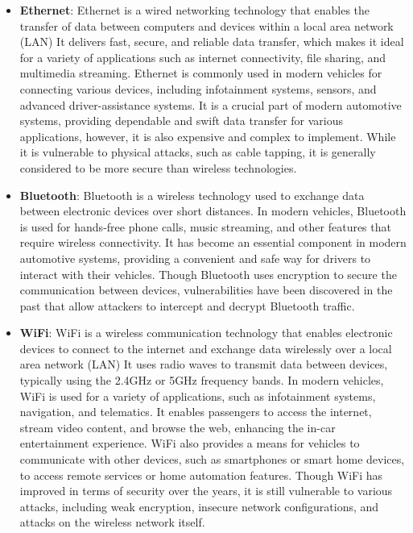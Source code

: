 \begin{itemize}
    \item \textbf{Ethernet}: Ethernet is a wired networking technology that enables the transfer of data between computers and devices within a local area network (LAN)
    It delivers fast, secure, and reliable data transfer, which makes it ideal for a variety of applications such as internet connectivity, file sharing, and multimedia streaming.
    Ethernet is commonly used in modern vehicles for connecting various devices, including infotainment systems, sensors, and advanced driver-assistance systems. 
    It is a crucial part of modern automotive systems, providing dependable and swift data transfer for various applications, however, it is also expensive and complex to implement.
    While it is vulnerable to physical attacks, such as cable tapping, it is generally considered to be more secure than wireless technologies.

    \item \textbf{Bluetooth}: Bluetooth is a wireless technology used to exchange data between electronic devices over short distances.
    In modern vehicles, Bluetooth is used for hands-free phone calls, music streaming, and other features that require wireless connectivity. 
    It has become an essential component in modern automotive systems, providing a convenient and safe way for drivers to interact with their vehicles.
    Though Bluetooth uses encryption to secure the communication between devices, vulnerabilities have been discovered in the past that allow attackers to intercept and decrypt Bluetooth traffic.

    \item \textbf{WiFi}: WiFi is a wireless communication technology that enables electronic devices to connect to the internet and exchange data wirelessly over a local area network (LAN)
    It uses radio waves to transmit data between devices, typically using the 2.4GHz or 5GHz frequency bands.
    In modern vehicles, WiFi is used for a variety of applications, such as infotainment systems, navigation, and telematics. 
    It enables passengers to access the internet, stream video content, and browse the web, enhancing the in-car entertainment experience. 
    WiFi also provides a means for vehicles to communicate with other devices, such as smartphones or smart home devices, to access remote services or home automation features.
    Though WiFi has improved in terms of security over the years, it is still vulnerable to various attacks, including weak encryption, insecure network configurations, and attacks on the wireless network itself.
    

\end{itemize}
